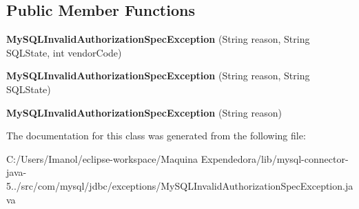 \subsection*{Public Member Functions}
\begin{DoxyCompactItemize}
\item 
\mbox{\label{classcom_1_1mysql_1_1jdbc_1_1exceptions_1_1_my_s_q_l_invalid_authorization_spec_exception_a896408d5f3ca91e80c691a5639f9ccde}} 
{\bfseries My\+S\+Q\+L\+Invalid\+Authorization\+Spec\+Exception} (String reason, String S\+Q\+L\+State, int vendor\+Code)
\item 
\mbox{\label{classcom_1_1mysql_1_1jdbc_1_1exceptions_1_1_my_s_q_l_invalid_authorization_spec_exception_af6615cec36eb56e2b94a900e61693787}} 
{\bfseries My\+S\+Q\+L\+Invalid\+Authorization\+Spec\+Exception} (String reason, String S\+Q\+L\+State)
\item 
\mbox{\label{classcom_1_1mysql_1_1jdbc_1_1exceptions_1_1_my_s_q_l_invalid_authorization_spec_exception_a5a0977598deb6106f3607c3f1a5eeab5}} 
{\bfseries My\+S\+Q\+L\+Invalid\+Authorization\+Spec\+Exception} (String reason)
\end{DoxyCompactItemize}


The documentation for this class was generated from the following file\+:\begin{DoxyCompactItemize}
\item 
C\+:/\+Users/\+Imanol/eclipse-\/workspace/\+Maquina Expendedora/lib/mysql-\/connector-\/java-\/5../src/com/mysql/jdbc/exceptions/My\+S\+Q\+L\+Invalid\+Authorization\+Spec\+Exception.\+java\end{DoxyCompactItemize}
